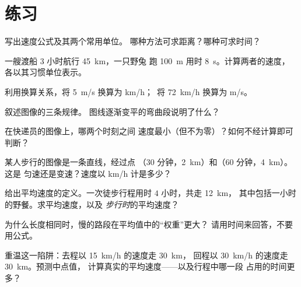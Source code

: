 \section{练习}

\begin{exercise}[$\star$]\label{exo:g7:motion-average-speed:1}
写出速度公式及其两个常用单位。
哪种方法可求距离？哪种可求时间？
\end{exercise}

\begin{exercise}[$\star$]\label{exo:g7:motion-average-speed:2}
一艘渡船 $3$ 小时航行 \qty{45}{km}，一只野兔
跑 \qty{100}{m} 用时 \qty{8}{s}。计算两者的速度，
各以其习惯单位表示。
\end{exercise}

\begin{exercise}[$\star$]\label{exo:g7:motion-average-speed:3}
利用换算关系，将 \qty{5}{m/s} 换算为 \unit{km/h}；\
将 \qty{72}{km/h} 换算为 \unit{m/s}。
\end{exercise}

\begin{exercise}[$\star$]\label{exo:g7:motion-average-speed:4}
叙述图像的三条规律。
图线逐渐变平的弯曲段说明了什么？
\end{exercise}

\begin{exercise}[$\star$]\label{exo:g7:motion-average-speed:5}
在快递员的图像上，哪两个时刻之间
速度最小（但不为零）？如何不经计算即可判断？
\end{exercise}

\begin{exercise}[$\star$]\label{exo:g7:motion-average-speed:6}
某人步行的图像是一条直线，经过点
（$30$ 分钟，\qty{2}{km}）和（$60$ 分钟，\qty{4}{km}）。这是
匀速还是变速？速度以 \unit{km/h} 计是多少？
\end{exercise}

\begin{exercise}[$\star$]\label{exo:g7:motion-average-speed:7}
给出平均速度的定义。一次徒步行程用时 $4$ 小时，共走 \qty{12}{km}，
其中包括一小时的野餐。求平均速度，以及
\emph{步行时}的平均速度？
\end{exercise}

\begin{exercise}[$\star\star$]\label{exo:g7:motion-average-speed:8}
为什么长度相同时，慢的路段在平均值中的“权重”更大？
请用时间来回答，不要用公式。
\end{exercise}

\begin{exercise}[$\star\star$]\label{exo:g7:motion-average-speed:9}
重温这一陷阱：去程以 \qty{15}{km/h} 的速度走 \qty{30}{km}，
回程以 \qty{30}{km/h} 的速度走 \qty{30}{km}。预测中点值，
计算真实的平均速度——以及行程中哪一段
占用的时间更多？
\end{exercise}

